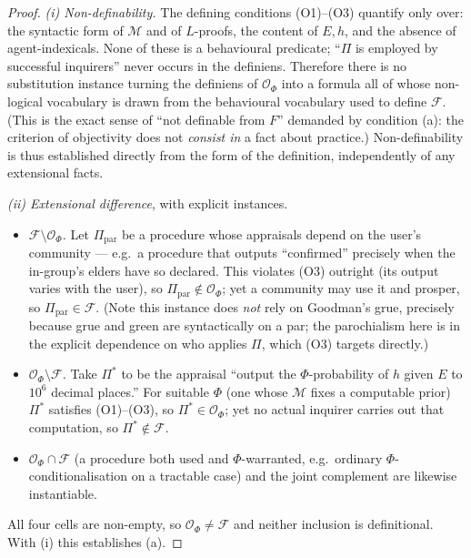 \documentclass{amsart}
\theoremstyle{definition}
\theoremstyle{plain}
\theoremstyle{remark}
\begin{document}
\begin{proof}
\emph{(i) Non-definability.} The defining conditions (O1)--(O3) quantify only
over: the syntactic form of $\mathcal{M}$ and of $L$-proofs, the content of
$E,h$, and the absence of agent-indexicals. None of these is a behavioural
predicate; ``$\Pi$ is employed by successful inquirers'' never occurs in the
definiens. Therefore there is no substitution instance turning the definiens of
$\mathcal{O}_\Phi$ into a formula all of whose non-logical vocabulary is drawn
from the behavioural vocabulary used to define $\mathcal{F}$. (This is the exact
sense of ``not definable from $F$'' demanded by condition (a): the criterion of
objectivity does not \emph{consist in} a fact about practice.) Non-definability
is thus established directly from the form of the definition, independently of
any extensional facts.

\emph{(ii) Extensional difference}, with explicit instances.
\begin{itemize}
\item \emph{$\mathcal{F}\setminus\mathcal{O}_\Phi$.} Let $\Pi_{\text{par}}$ be a
procedure whose appraisals depend on the user's community --- e.g.\ a procedure
that outputs ``confirmed'' precisely when the in-group's elders have so
declared. This violates (O3) outright (its output varies with the user), so
$\Pi_{\text{par}}\notin\mathcal{O}_\Phi$; yet a community may use it and
prosper, so $\Pi_{\text{par}}\in\mathcal{F}$. (Note this instance does
\emph{not} rely on Goodman's grue, precisely because grue and green are
syntactically on a par; the parochialism here is in the explicit dependence on
who applies $\Pi$, which (O3) targets directly.)
\item \emph{$\mathcal{O}_\Phi\setminus\mathcal{F}$.} Take $\Pi^\ast$ to be the
appraisal ``output the $\Phi$-probability of $h$ given $E$ to $10^{6}$ decimal
places.'' For suitable $\Phi$ (one whose $\mathcal{M}$ fixes a computable prior)
$\Pi^\ast$ satisfies (O1)--(O3), so $\Pi^\ast\in\mathcal{O}_\Phi$; yet no actual
inquirer carries out that computation, so $\Pi^\ast\notin\mathcal{F}$.
\item \emph{$\mathcal{O}_\Phi\cap\mathcal{F}$} (a procedure both used and
$\Phi$-warranted, e.g.\ ordinary $\Phi$-conditionalisation on a tractable case)
and the joint complement are likewise instantiable.
\end{itemize}
All four cells are non-empty, so $\mathcal{O}_\Phi\neq\mathcal{F}$ and neither
inclusion is definitional. With (i) this establishes (a).
\end{proof}
\end{document}
